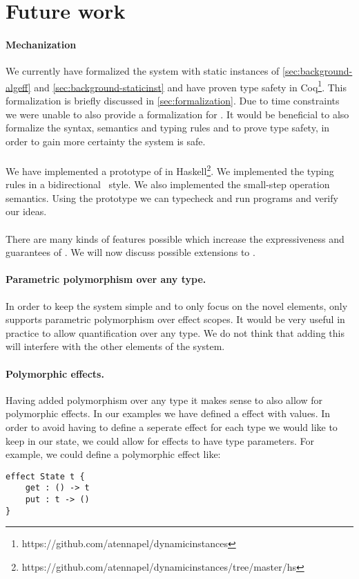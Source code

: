 \section{Future work}

\paragraph{Mechanization}
We currently have formalized the system with static instances of \cref{sec:background-algeff} and \cref{sec:background-staticinst} and have proven type safety in Coq\footnote{https://github.com/atennapel/dynamicinstances}.
This formalization is briefly discussed in \cref{sec:formalization}.
Due to time constraints we were unable to also provide a formalization for \lang{}.
It would be beneficial to also formalize the syntax, semantics and typing rules \lang{} and to prove type safety, in order to gain more certainty the system is safe.
\\\\
We have implemented a prototype of \lang{} in Haskell\footnote{https://github.com/atennapel/dynamicinstances/tree/master/hs}.
We implemented the typing rules in a bidirectional~\autocite{bidirectionaltyping} style.
We also implemented the small-step operation semantics.
Using the prototype we can typecheck and run \lang{} programs and verify our ideas.
\\\\
There are many kinds of features possible which increase the expressiveness and guarantees of \lang{}.
We will now discuss possible extensions to \lang{}.

\paragraph{Parametric polymorphism over any type.}
In order to keep the system simple and to only focus on the novel elements, \lang{} only supports parametric polymorphism over effect scopes.
It would be very useful in practice to allow quantification over any type.
We do not think that adding this will interfere with the other elements of the system.

\paragraph{Polymorphic effects.}
Having added polymorphism over any type it makes sense to also allow for polymorphic effects.
In our examples we have defined a  effect with  values.
In order to avoid having to define a seperate effect for each type we would like to keep in our state, we could allow for effects to have type parameters.
For example, we could define a polymorphic  effect like:
\begin{verbatim}
effect State t {
	get : () -> t
	put : t -> ()
}
\end{verbatim}

